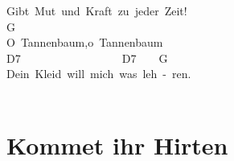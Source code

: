 \documentclass[]{book}
\let\stdsection\section
\renewcommand\section{\clearpage\stdsection}
\begin{document}
Gibt~Mut~und~Kraft~zu~jeder~Zeit!\\
\hspace*{0.333em}\hspace*{0.333em}G~~~\\
O~Tannenbaum,o~Tannenbaum\\
\hspace*{0.333em}\hspace*{0.333em}\hspace*{0.333em}\hspace*{0.333em}\hspace*{0.333em}D7~~~~~~~~~~~~~~~~~~D7~~~~G~~~~~~\\
Dein~Kleid~will~mich~was~leh~-~ren.~\\
~\\

\hypertarget{kommet-ihr-hirten}{%
\section{Kommet ihr Hirten}\label{kommet-ihr-hirten}}
\end{document}
